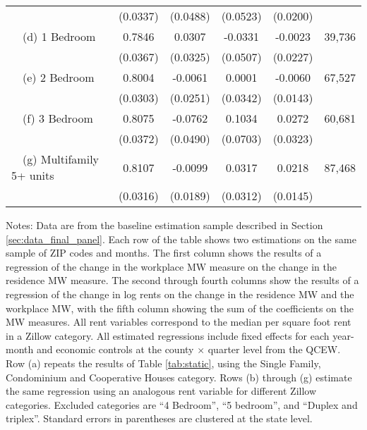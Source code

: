 \begin{landscape}
\begin{table}[ht!]
\begin{tabular}{@{}lccccc@{}}
                                                 & (0.0337) & (0.0488) & (0.0523) & (0.0200) &      \\
        $\quad$(d) 1 Bedroom                     &  0.7846  &  0.0307  &  -0.0331  &  -0.0023  & 39,736 \\
                                                 & (0.0367) & (0.0325) & (0.0507) & (0.0227) &      \\
        $\quad$(e) 2 Bedroom                     &  0.8004  &  -0.0061  &  0.0001  &  -0.0060  & 67,527 \\
                                                 & (0.0303) & (0.0251) & (0.0342) & (0.0143) &      \\
        $\quad$(f) 3 Bedroom                     &  0.8075  &  -0.0762  &  0.1034  &  0.0272  & 60,681 \\
                                                 & (0.0372) & (0.0490) & (0.0703) & (0.0323) &      \\
        $\quad$(g) Multifamily 5+ units          &  0.8107  &  -0.0099  &  0.0317  &  0.0218  & 87,468 \\
                                                 & (0.0316) & (0.0189) & (0.0312) & (0.0145) &      \\ \bottomrule
    \end{tabular}

    \begin{minipage}{.95\linewidth} \footnotesize
        \vspace{2mm}
        Notes:
        Data are from the baseline estimation sample described in Section 
        \ref{sec:data_final_panel}.
        Each row of the table shows two estimations on the same sample of ZIP 
        codes and months.
        The first column shows the results of a regression of the change in the 
        workplace MW measure on the change in the residence MW measure.
        The second through fourth columns show the results of a regression of 
        the change in log rents on the change in the residence MW and the 
        workplace MW, with the fifth column showing the sum of the coefficients 
        on the MW measures.
        All rent variables correspond to the median per square foot rent in a 
        Zillow category.
        All estimated regressions include fixed effects for each year-month and 
        economic controls at the county $\times$ quarter level from the QCEW.
        Row (a) repeats the results of Table \ref{tab:static}, using the 
        Single Family, Condominium and Cooperative Houses category.
        Rows (b) through (g) estimate the same regression using an analogous 
        rent variable for different Zillow categories.
        Excluded categories are ``4 Bedroom'', ``5 bedroom'', and 
        ``Duplex and triplex''.
        Standard errors in parentheses are clustered at the state level.
    \end{minipage}
\end{table}
\end{landscape}
